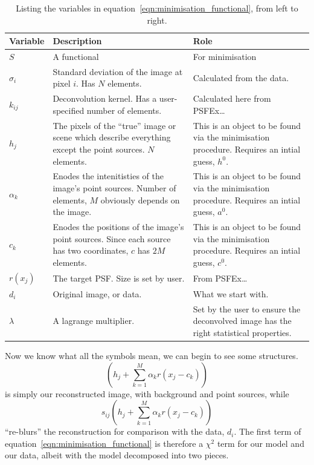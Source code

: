 \documentclass[letterpaper, 11pt]{article}
\begin{document}
\begin{center}
	\begin{table}[h!]
		\begin{tabularx}{\textwidth}{l | X | X}
			\hline
			Variable	& Description & Role\\ \hline
			$S$ 	& A functional & For minimisation\\ \hline
			$\sigma_i$ & Standard deviation of the image at pixel $i$. Has $N$ elements. & Calculated from the data.\\ \hline
			$k_{ij}$	& Deconvolution kernel. Has a user-specified number of elements. & Calculated here from PSFEx\ldots\\ \hline
			$h_j$		& The pixels of the ``true'' image or scene which describe everything except the point sources. $N$ elements. & This is an object to be found via the minimisation procedure. Requires an intial guess, $h^0$.\\ \hline
			$\alpha_k$	& Enodes the intenitisties of the image's point sources. Number of elements, $M$ obviously depends on the image. & This is an object to be found via the minimisation procedure. Requires an intial guess, $a^0$.\\ \hline
			$c_k$	& Enodes the positions of the image's point sources. Since each source has two coordinates, $c$ has $2M$ elements. & This is an object to be found via the minimisation procedure. Requires an intial guess, $c^0$.\\ \hline
			$r(x_j)$	& The target PSF. Size is set by user. & From PSFEx\ldots\\ \hline 
			$d_i$	& Original image, or data. & What we start with.\\ \hline
			$\lambda$	& A lagrange multiplier. & Set by the user to ensure the deconvolved image has the right statistical properties.\\
			\hline
		\end{tabularx}
		\caption{Listing the variables in equation~\ref{eqn:minimisation_functional}, from left to right.}
		\label{tbl:minimisation_functional}
	\end{table}
\end{center}

Now we know what all the symbols mean, we can begin to see some structures.
\begin{equation}
	\left(h_j +\sum_{k=1}^M \alpha_k r(x_j-c_k)\right)
\end{equation}
is simply our reconstructed image, with background and point sources, while
\begin{equation}
	s_{ij}\left(h_j +\sum_{k=1}^M \alpha_k r(x_j-c_k)\right)
\end{equation}
``re-blurs'' the reconstruction for comparison with the data, $d_i$. The first term of equation~\ref{eqn:minimisation_functional} is therefore a $\chi^2$ term for our model and our data, albeit with the model decomposed into two pieces.
\end{document}
